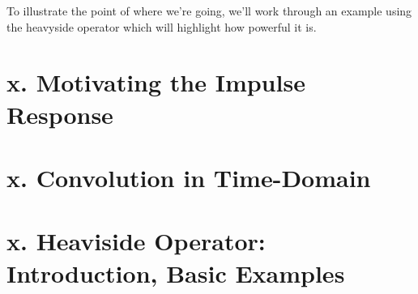 \documentclass{report}
\begin{document}
To illustrate the point of where we're going, we'll work through an example using the heavyside operator which will highlight how powerful it is. 




\section{x. Motivating the Impulse Response}

\section{x. Convolution in Time-Domain}

\section{x. Heaviside Operator: Introduction, Basic Examples}
\end{document}
